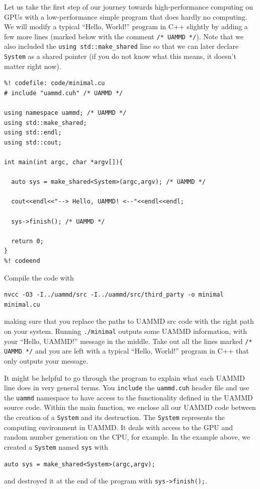Let us take the first step of our journey towards high-performance computing on
GPUs with a low-performance simple program that does hardly no computing. We
will modify a typical ``Hello, World!'' program in C++ slightly by adding a few
more lines (marked below with the comment \texttt{/* UAMMD */}). Note that we
also included the \texttt{using std::make\_shared} line so that we can later
declare \texttt{System} as a shared pointer (if you do not know what this means,
it doesn't matter right now).
\begin{lstlisting}
%! codefile: code/minimal.cu
# include "uammd.cuh" /* UAMMD */

using namespace uammd; /* UAMMD */
using std::make_shared;
using std::endl;
using std::cout;

int main(int argc, char *argv[]){

  auto sys = make_shared<System>(argc,argv); /* UAMMD */

  cout<<endl<<"--> Hello, UAMMD! <--"<<endl<<endl;

  sys->finish(); /* UAMMD */

  return 0;
}
%! codeend
\end{lstlisting}
Compile the code with
\begin{verbatim}
nvcc -O3 -I../uammd/src -I../uammd/src/third_party -o minimal
minimal.cu
\end{verbatim}
making sure that you replace the paths to UAMMD src code with the right path on
your system. Running \texttt{./minimal} outputs some UAMMD information, with
your ``Hello, UAMMD!'' message in the middle. Take out all the lines marked
\texttt{/* UAMMD */} and you are left with a typical ``Hello, World!'' program
in C++ that only outputs your message.

It might be helpful to go through the program to explain what each UAMMD line 
does in very general terms. You \texttt{include} the \texttt{uammd.cuh} header 
file and use the \texttt{uammd} namespace to have access to the functionality 
defined in the UAMMD source code. Within the main function, we enclose all our 
UAMMD code between the creation of a \texttt{System} and its destruction. The
\texttt{System} represents the computing environment in UAMMD. It deals with
access to the GPU and random number generation on the CPU, for example. In the
example above, we created a \texttt{System} named \texttt{sys} with
\begin{verbatim}
auto sys = make_shared<System>(argc,argv);
\end{verbatim}
and destroyed it at the end of the program with \texttt{sys->finish();}.

